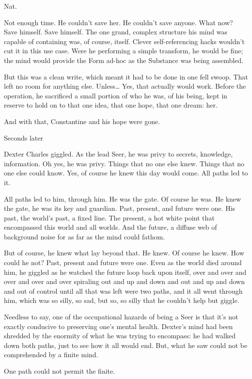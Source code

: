 Nat.

Not enough time. He couldn’t save her. He couldn’t save anyone. What now? Save himself. Save himself. The one grand, complex structure his mind was capable of containing was, of course, itself. Clever self-referencing hacks wouldn’t cut it in this use case. Were he performing a simple transform, he would be fine; the mind would provide the Form ad-hoc as the Substance was being assembled.

But this was a clean write, which meant it had to be done in one fell swoop. That left no room for anything else. Unless… Yes, that actually would work. Before the operation, he sacrificed a small portion of who he was, of his being, kept in reserve to hold on to that one idea, that one hope, that one dream: her.

And with that, Constantine and his hope were gone.

Seconds later

Dexter Charles giggled. As the lead Seer, he was privy to secrets, knowledge, information. Oh yes, he was privy. Things that no one else knew. Things that no one else could know. Yes, of course he knew this day would come. All paths led to it.

All paths led to him, through him. He was the gate. Of course he was. He knew the gate, he was its key and guardian. Past, present, and future were one. His past, the world’s past, a fixed line. The present, a hot white point that encompassed this world and all worlds. And the future, a diffuse web of background noise for as far as the mind could fathom.

But of course, he knew what lay beyond that. He knew. Of course he knew. How could he not? Past, present and future were one. Even as the world died around him, he giggled as he watched the future loop back upon itself, over and over and over and over and over spiraling out and up and down and out and up and down and out of control until all that was left were two paths, and it all went through him, which was so silly, so sad, but so, so silly that he couldn’t help but giggle.

Needless to say, one of the occupational hazards of being a Seer is that it’s not exactly conducive to preserving one’s mental health. Dexter’s mind had been shredded by the enormity of what he was trying to encompass: he had walked down both paths, just to see how it all would end. But, what he saw could not be comprehended by a finite mind.

One path could not permit the finite.


